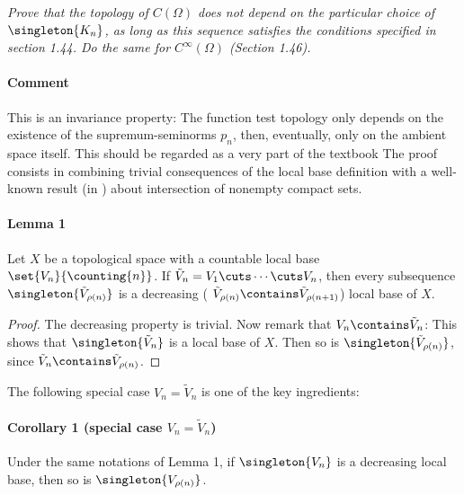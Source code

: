 \textit{
Prove that the topology of $C(\Omega)$ does not depend on the particular 
choice of $\singleton{K_n}$, as long as this sequence satisfies the conditions 
specified in section 1.44. Do the same for $C^\infty(\Omega)$ (Section 1.46).}
%
\paragraph{Comment}This is an invariance property: 
The function test topology only depends on the existence of the 
supremum-seminorms $p_n$, then, eventually, 
only on the ambient space itself. 
This should be regarded as a very part of the textbook \cite{FA}
%
The proof consists in combining trivial consequences of the local base 
definition with a well-known result (\eg [2.6] in \cite{BigRudin}) 
about intersection of nonempty compact sets. 

\paragraph{Lemma 1} Let $X$ be a topological space with a countable local base 
$\set{V_n}{\counting{n}}$. 
If 
%
  $\tilde{V}_{n} = V_1 \cuts \cdots \cuts V_n$, 
%
then every subsequence 
% 
  $\singleton{\tilde{V}_{\rho(n)}}$ 
%
is a decreasing (\ie 
%
  $\tilde{V}_{\rho(n)} \contains \tilde{V}_{\rho(n+1)}$)
%
local base of $X$.
%
\begin{proof}
The decreasing property is trivial. Now remark that 
%
  $V_n \contains \tilde{V}_{n}$:
%
This shows that 
%
  $\singleton{\tilde{V}_{n}}$ 
% 
is a local base of $X$. Then so is 
%
  $\singleton{\tilde{V}_{\rho(n)}}$,
% 
since $\tilde{V}_{n} \contains \tilde{V}_{\rho(n)}$.
\end{proof}
%
\noindent The following special case 
%
  $V_{n} = \tilde{V}_{n}$ 
% 
is one of the key ingredients:
\paragraph{Corollary 1 (special case $V_{n} = \tilde{V}_{n}$)}
Under the same notations of Lemma 1, if $\singleton{V_{n}}$ is a decreasing 
local base, then so is $\singleton{V_{\rho(n)}}$.
%
